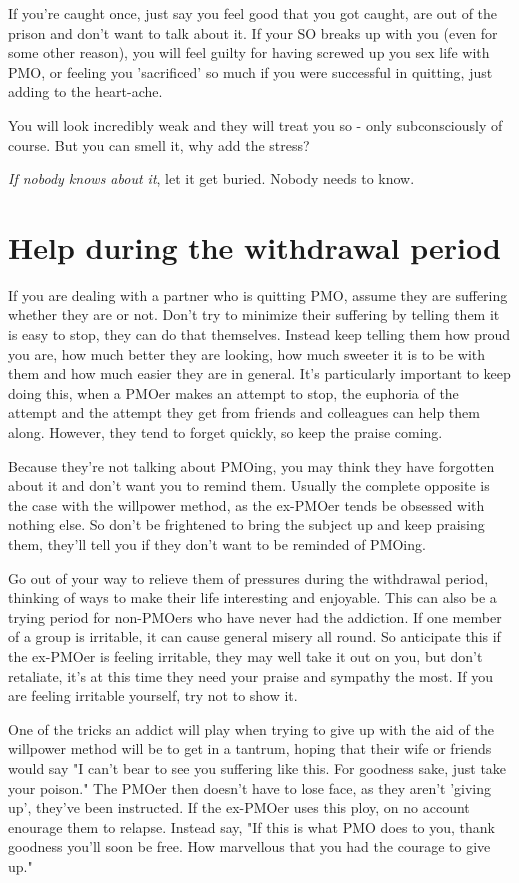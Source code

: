 \documentclass[easypeasy.tex]{subfiles}
\begin{document}
If you're caught once, just say you feel good that you got caught, are out of the prison and don't want to talk about it. If your SO breaks up with you (even for some other reason), you will feel guilty for having screwed up you sex life with PMO, or feeling you 'sacrificed' so much if you were successful in quitting, just adding to the heart-ache.

You will look incredibly weak and they will treat you so - only subconsciously of course. But you can smell it, why add the stress?

\textit{If nobody knows about it}, let it get buried. Nobody needs to know.

\section{Help during the withdrawal period}

If you are dealing with a partner who is quitting PMO, assume they are suffering whether they are or not. Don't try to minimize their suffering by telling them it is easy to stop, they can do that themselves. Instead keep telling them how proud you are, how much better they are looking, how much sweeter it is to be with them and how much easier they are in general. It's particularly important to keep doing this, when a PMOer makes an attempt to stop, the euphoria of the attempt and the attempt they get from friends and colleagues can help them along. However, they tend to forget quickly, so keep the praise coming.

Because they're not talking about PMOing, you may think they have forgotten about it and don't want you to remind them. Usually the complete opposite is the case with the willpower method, as the ex-PMOer tends be obsessed with nothing else. So don't be frightened to bring the subject up and keep praising them, they'll tell you if they don't want to be reminded of PMOing.

Go out of your way to relieve them of pressures during the withdrawal period, thinking of ways to make their life interesting and enjoyable. This can also be a trying period for non-PMOers who have never had the addiction. If one member of a group is irritable, it can cause general misery all round. So anticipate this if the ex-PMOer is feeling irritable, they may well take it out on you, but don't retaliate, it's at this time they need your praise and sympathy the most. If you are feeling irritable yourself, try not to show it.

One of the tricks an addict will play when trying to give up with the aid of the willpower method will be to get in a tantrum, hoping that their wife or friends would say "I can't bear to see you suffering like this. For goodness sake, just take your poison." The PMOer then doesn't have to lose face, as they aren't 'giving up', they've been instructed. If the ex-PMOer uses this ploy, on no account enourage them to relapse. Instead say, "If this is what PMO does to you, thank goodness you'll soon be free. How marvellous that you had the courage to give up."
\end{document}

